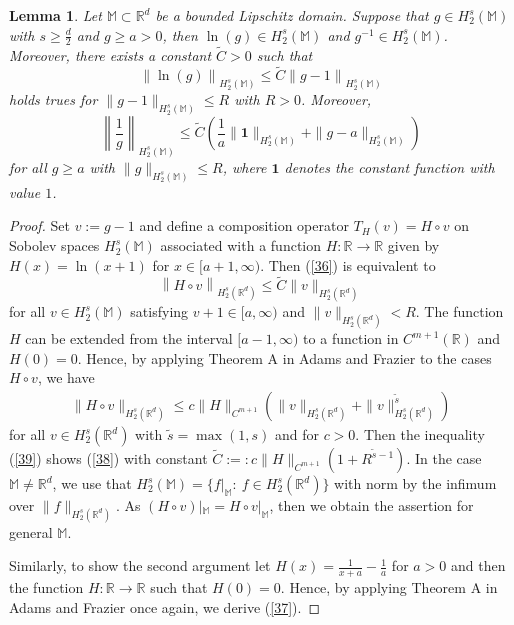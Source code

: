 \documentclass[10pt]{iopart}
\newtheorem{lemma}[theorem]{Lemma}
\begin{document}
\begin{lemma}\label{Lemma-4.5}
Let $\mathbb{M}\subset\mathbb{R}^{d}$ be a bounded Lipschitz domain. Suppose that $g\in H_{2}^{s}(\mathbb{M})$ with $s\geq \frac{d}{2}$ and $g\geq a>0$, then $\ln(g)\in H_{2}^{s}(\mathbb{M})$ and $g^{-1}\in H_{2}^{s}(\mathbb{M})$. Moreover, there exists a constant $\tilde{C}>0$ such that
\begin{equation}\label{36}
\left\|\ln (g)\right\|_{H_{2}^{s}(\mathbb{M})}\leq \tilde{C} \left\|g-1\right\|_{H_{2}^{s}(\mathbb{M})}
\end{equation}
holds trues for $\|g-1\|_{H_{2}^{s}(\mathbb{M})}\leq R$ with $R>0$.
Moreover, 
\begin{equation}\label{37}
\left\|\frac{1}{g}\right\|_{H_{2}^{s}(\mathbb{M})}\leq \tilde{C}\left(\frac{1}{a}\|\mathbf{1}\|_{H_{2}^{s}(\mathbb{M})}+
\|g-a\|_{H_{2}^{s}(\mathbb{M})}\right)
\end{equation}
for all $g\geq a$ with $\|g\|_{H_{2}^{s}(\mathbb{M})}\leq R$, where $\mathbf{1}$ denotes the constant function with value $1$.
\end{lemma}

\begin{proof}
Set $v:=g-1$ and define a composition operator $T_{H}(v)=H\circ v$ on Sobolev spaces $H_{2}^{s}(\mathbb{M})$ associated with a function 
$H: \mathbb{R}\rightarrow \mathbb{R}$ given by $H(x)=\ln (x+1)$ for $x\in[a+1, \infty)$. Then (\ref{36}) is equivalent to
\begin{equation}\label{38}
\left\|H\circ v\right\|_{H_{2}^{s}(\mathbb{R}^{d})}\leq \widetilde{C} \|v\|_{H_{2}^{s}(\mathbb{R}^{d})}
\end{equation}
for all $v\in H_{2}^{s}(\mathbb{M})$ satisfying $v+1\in [a, \infty)$ and $\|v\|_{H_{2}^{s}(\mathbb{R}^{d})}<R$. 
The function $H$ can be extended from the interval $[a-1, \infty)$ to a function in $C^{m+1}(\mathbb{R})$ and $H(0)=0$.  Hence, by applying Theorem A in Adams and Frazier \cite{Adams1992} to 
the cases $H\circ v$, we have
\begin{align}\label{39}
\|H\circ v\|_{H_{2}^{s}(\mathbb{R}^{d})}\leq c\|H\|_{C^{m+1}}\left(\|v\|_{H_{2}^{s}(\mathbb{R}^{d})}+
\|v\|_{H_{2}^{s}(\mathbb{R}^{d})}^{\tilde{s}}\right)
\end{align}
for all $v\in H_{2}^{s}(\mathbb{R}^{d})$ with $\tilde{s}=\max(1, s)$ and for $c>0$. Then the inequality (\ref{39}) shows (\ref{38}) with constant $\tilde{C}:=
:c\|H\|_{C^{m+1}}(1+R^{\tilde{s}-1})$. In the case $\mathbb{M}\neq \mathbb{R}^{d}$, we use that $H_{2}^{s}(\mathbb{M})=\{f|_{\mathbb{M}}: ~
f\in H_{2}^{s}(\mathbb{R}^{d})\}$ with norm by the infimum over $\|f\|_{H_{2}^{s}(\mathbb{R}^{d})}$. As $(H\circ v)|_{\mathbb{M}}
=H\circ v|_{\mathbb{M}}$, then we obtain the assertion for general $\mathbb{M}$. 

Similarly, to show the second argument let $H(x)=\frac{1}{x+a}-\frac{1}{a}$ for $a>0$ and then the function $H: \mathbb{R}\rightarrow \mathbb{R}$ such that $H(0)=0$. Hence, by applying  Theorem A 
in Adams and Frazier \cite{Adams1992} once again, we derive (\ref{37}).
\end{proof}
\end{document}
